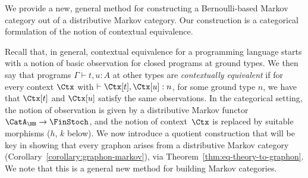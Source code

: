 We provide a new, general method for constructing a Bernoulli-based Markov
category out of a distributive Markov category.
Our construction is a categorical formulation of the notion of
contextual equivalence.

Recall that, in general, contextual equivalence for a programming language starts
with a notion of basic observation for closed programs at ground
types. We then say that programs $\Gamma\vdash t,u:A$ at other types
are \emph{contextually equivalent} if for every context $\Ctx$ with $\vdash\Ctx[t],\Ctx[u]:n$, for some ground type $n$,
we have that $\Ctx[t]$ and $\Ctx[u]$ satisfy the same observations. 
In the categorical setting, the notion of observation is given by a
distributive Markov functor $\CatA_\NN\to\FinStoch$, and the notion of
context~$\Ctx$ is replaced by suitable morphisms ($h$, $k$ below). 
We now introduce a quotient construction that will be key in showing that every graphon arises from a distributive Markov category (Corollary~\ref{corollary:graphon-markov}), via Theorem~\ref{thm:eq-theory-to-graphon}.
We note that this is a general new method for building Markov categories.


